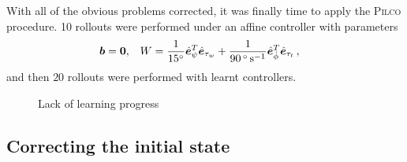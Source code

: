 \documentclass[main.tex]{subfiles}
\begin{document}
	With all of the obvious problems corrected, it was finally time to apply the \textsc{Pilco} procedure.
	10 rollouts were performed under an affine controller with parameters
	\begin{align}
		\bm{b} &= \bm{0}, &
		W &=
			\frac{1}{\SI{15}{\degree}}
			\hat{\bm{e}}_{\psi}^T\hat{\bm{e}}_{\tau_w}
			+ \frac{1}{\SI{90}{\degree\per\second}}
			\hat{\bm{e}}_{\dot\phi}^T\hat{\bm{e}}_{\tau_t}\,,
	\end{align}
	and then $20$ rollouts were performed with learnt controllers.
	\begin{figure}
		
		\caption{Lack of learning progress}
	\end{figure}

	\subsection{Correcting the initial state}


\bib
\end{document}
